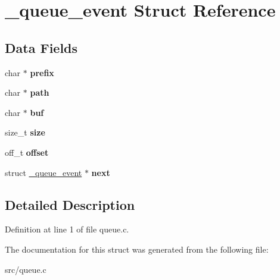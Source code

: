 \hypertarget{struct__queue__event}{\section{\-\_\-queue\-\_\-event \-Struct \-Reference}
\label{struct__queue__event}
}
\subsection*{\-Data \-Fields}
\begin{DoxyCompactItemize}
\item 
\hypertarget{struct__queue__event_a840890259799e31a81a600e170a04040}{char $\ast$ {\bfseries prefix}}\label{struct__queue__event_a840890259799e31a81a600e170a04040}

\item 
\hypertarget{struct__queue__event_ab42f28bb5b475e365a83c36c3e5aa077}{char $\ast$ {\bfseries path}}\label{struct__queue__event_ab42f28bb5b475e365a83c36c3e5aa077}

\item 
\hypertarget{struct__queue__event_a9ae9cfa7e62bff88b588dab57923c85f}{char $\ast$ {\bfseries buf}}\label{struct__queue__event_a9ae9cfa7e62bff88b588dab57923c85f}

\item 
\hypertarget{struct__queue__event_a8d0a1e24e958042d0f33b38baa1d54c6}{size\-\_\-t {\bfseries size}}\label{struct__queue__event_a8d0a1e24e958042d0f33b38baa1d54c6}

\item 
\hypertarget{struct__queue__event_a6f5c23fc61c36753cbaf9bb5d799dd07}{off\-\_\-t {\bfseries offset}}\label{struct__queue__event_a6f5c23fc61c36753cbaf9bb5d799dd07}

\item 
\hypertarget{struct__queue__event_a00345ecb26caedbfbdf5414f17f93267}{struct \hyperlink{struct__queue__event}{\-\_\-queue\-\_\-event} $\ast$ {\bfseries next}}\label{struct__queue__event_a00345ecb26caedbfbdf5414f17f93267}

\end{DoxyCompactItemize}


\subsection{\-Detailed \-Description}


\-Definition at line 1 of file queue.\-c.



\-The documentation for this struct was generated from the following file\-:\begin{DoxyCompactItemize}
\item 
src/queue.\-c\end{DoxyCompactItemize}
